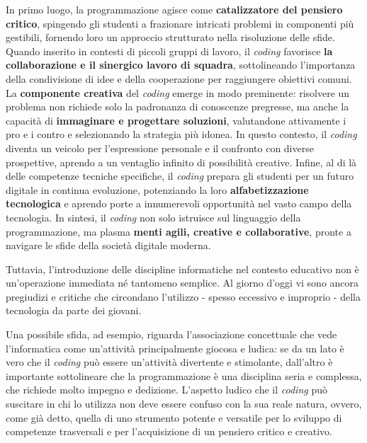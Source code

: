 In primo luogo, la programmazione agisce come \textbf{catalizzatore del pensiero critico}, 
spingendo gli studenti a frazionare intricati problemi in componenti più gestibili, fornendo loro un approccio strutturato nella risoluzione delle sfide. Quando
inserito in contesti di piccoli gruppi di lavoro, il \textit{coding} favorisce \textbf{la collaborazione e il sinergico lavoro di squadra}, sottolineando l'importanza della condivisione
di idee e della cooperazione per raggiungere obiettivi comuni. La \textbf{componente creativa} del \textit{coding} emerge in modo preminente: risolvere un problema non richiede 
solo la padronanza di conoscenze pregresse, ma anche la capacità di \textbf{immaginare e progettare soluzioni}, valutandone attivamente i pro e i contro e selezionando
la strategia più idonea. In questo contesto, il \textit{coding} diventa un veicolo per l'espressione personale e il confronto con diverse prospettive, aprendo a un ventaglio
infinito di possibilità creative. Infine, al di là delle competenze tecniche specifiche, il \textit{coding} prepara gli studenti per un futuro digitale in continua evoluzione,
potenziando la loro \textbf{alfabetizzazione tecnologica} e aprendo porte a innumerevoli opportunità nel vasto campo della tecnologia. In sintesi, il \textit{coding} non solo istruisce
sul linguaggio della programmazione, ma plasma \textbf{menti agili, creative e collaborative}, pronte a navigare le sfide della società digitale moderna.

Tuttavia, l'introduzione delle discipline informatiche nel contesto educativo non è un'operazione immediata né tantomeno semplice.
Al giorno d'oggi vi sono ancora pregiudizi e critiche che circondano l'utilizzo - spesso eccessivo e improprio - della tecnologia da parte dei giovani.

Una possibile sfida, ad esempio, riguarda l'associazione concettuale che vede l'informatica come un'attività principalmente giocosa e ludica: se da un lato è vero che il \textit{coding} può essere un'attività divertente e stimolante,
dall'altro è importante sottolineare che la programmazione è una disciplina seria e complessa, che richiede molto impegno e dedizione. L'aspetto ludico che il \textit{coding} può suscitare in chi lo utilizza 
non deve essere confuso con la sua reale natura, ovvero, come già detto, quella di uno strumento potente e versatile per lo sviluppo di competenze trasversali e per l'acquisizione di un pensiero critico e creativo.

